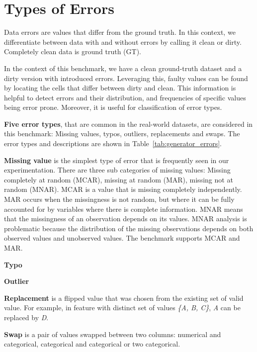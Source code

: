 \section{Types of Errors}
\label{sec:error_types}

Data errors are values that differ from the ground truth.
In this context, we differentiate between data with and without errors by calling it clean or dirty. 
Completely clean data is ground truth (GT).  


In the context of this benchmark, we have a clean ground-truth dataset and a dirty version with introduced errors.  
Leveraging this, faulty values can be found by locating the cells that differ between dirty and clean. 
This information is helpful to detect errors and their distribution, and frequencies of specific values being error prone.  
Moreover, it is useful for classification of error types.


\textbf{Five error types}, that are common in the real-world datasets, are considered in this benchmark: 
Missing values, typos, outliers, replacements and swaps. 
The error types and descriptions are shown in Table~\ref{tab:generator_errors}.


\textbf{Missing value} is the simplest type of error that is frequently seen in our experimentation. 
There are three sub categories of missing values: 
Missing completely at random (MCAR), missing at random (MAR), missing not at random (MNAR). 
MCAR is a value that is missing completely independently. 
MAR occurs when the missingness is not random, but where it can be fully accounted for by variables where there is complete information. 
MNAR means that the missingness of an observation depends on its values. MNAR analysis is problematic because the distribution of the missing observations depends on both observed values and unobserved values.
The benchmark supports MCAR and MAR.


\textbf{Typo}


\textbf{Outlier}

\textbf{Replacement} is a flipped value that was chosen from the existing set of valid value. For example, in feature with distinct set of values \emph{\{A, B, C\}}, \emph{A} can be replaced by \emph{D}. 


\textbf{Swap} is a pair of values swapped between two columns: numerical and categorical, categorical and categorical or two categorical.





